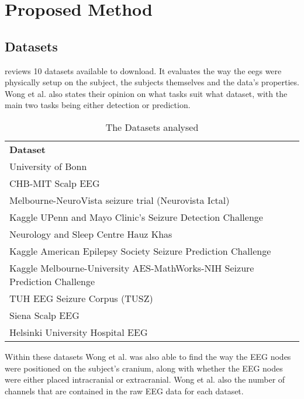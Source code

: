\documentclass[12pt]{article}
\begin{document}
\section{Proposed Method}

\subsection{Datasets}


\cite{wong2023eeg} reviews 10 datasets available to download. It evaluates the way the \acrshort{eegs} were physically setup on the subject, the subjects themselves and the data's properties. Wong et al. also states their opinion on what tasks suit what dataset, with the main two tasks being either detection or prediction. 

\begin{table}[H]
\centering
\begin{tabular}{l}
\textbf{Dataset}                       \\
University of Bonn                   \\
CHB-MIT Scalp EEG                    \\
Melbourne-NeuroVista seizure trial (Neurovista Ictal)                           \\
Kaggle UPenn and Mayo Clinic's Seizure Detection Challenge                     \\
Neurology and Sleep Centre Hauz Khas \\
Kaggle American Epilepsy Society Seizure Prediction Challenge                  \\
Kaggle Melbourne-University AES-MathWorks-NIH Seizure Prediction Challenge \\
TUH EEG Seizure Corpus (TUSZ)        \\
Siena Scalp EEG                      \\
Helsinki University Hospital EEG    
\end{tabular}
\caption{The Datasets analysed}
\end{table}

Within these datasets Wong et al. was also able to find the way the EEG nodes were positioned on the subject's cranium, along with whether the EEG nodes were either placed intracranial or extracranial. Wong et al. also the number of channels that are contained in the raw EEG data for each dataset.
\end{document}
